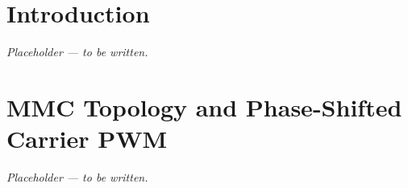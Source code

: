 \documentclass[conference, a4paper]{IEEEtran}
\begin{document}
\section{Introduction}
\label{sec:intro}


\textit{Placeholder — to be written.}

\section{MMC Topology and Phase-Shifted Carrier PWM}
\label{sec:topology}


\textit{Placeholder — to be written.}

\end{document}
